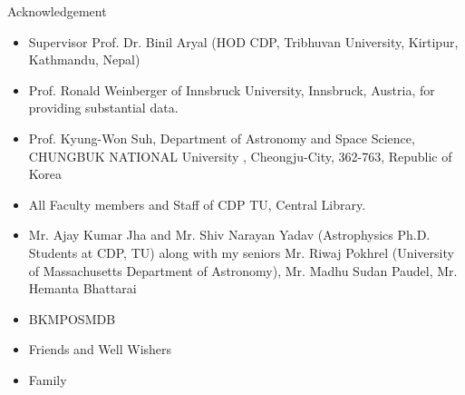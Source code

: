 \documentclass[12pt,a4paper]{beamer}
\begin{document}

\begin{frame}{Acknowledgement}
\begin{itemize}

\item Supervisor Prof. Dr. Binil Aryal (HOD CDP, Tribhuvan University, Kirtipur,
Kathmandu, Nepal)
\\
\item Prof. Ronald Weinberger of
Innsbruck University, Innsbruck, Austria, for providing
substantial data.
\item Prof. Kyung-Won Suh, Department of Astronomy and Space Science, CHUNGBUK NATIONAL University , Cheongju-City, 362-763, Republic of Korea
\item All Faculty members and Staff of CDP TU,
Central Library.
\item Mr. Ajay Kumar Jha and Mr. Shiv Narayan
Yadav (Astrophysics Ph.D. Students at CDP, TU) along with  my
seniors Mr. Riwaj Pokhrel (University of Massachusetts Department
of Astronomy), Mr. Madhu Sudan Paudel,  Mr. Hemanta Bhattarai
\item BKMPOSMDB
\item Friends and Well Wishers
\item Family
\end{itemize}
\end{frame}


\begin{frame}
\vspace{6cm}
\centering
\bf\Large\color{red}{Questions ???}\color{black}

\end{frame}

\begin{frame}
\begin{center}
\Large\bf\color{Yellow}{Thank You!!!}
\end{center}
\end{frame}
\end{document}
